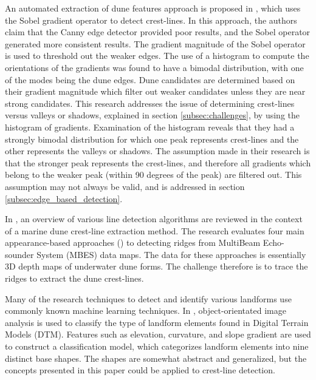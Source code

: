 An automated extraction of dune features approach is proposed in \cite{2015_automated_mapping_of_linear_dunefield}, which uses the Sobel gradient operator to detect crest-lines. In this approach, the authors claim that the Canny edge detector provided poor results, and the Sobel operator generated more consistent results. The gradient magnitude of the Sobel operator is used to threshold out the weaker edges. The use of a histogram to compute the orientations of the gradients was found to have a bimodal distribution, with one of the modes being the dune edges. Dune candidates are determined based on their gradient magnitude which filter out weaker candidates unless they are near strong candidates. This research addresses the issue of determining crest-lines versus valleys or shadows, explained in section \ref{subsec:challenges}, by using the histogram of gradients. Examination of the histogram reveals that they had a strongly bimodal distribution for which one peak represents crest-lines and the other represents the valleys or shadows. The assumption made in their research is that the stronger peak represents the crest-lines, and therefore all gradients which belong to the weaker peak (within 90 degrees of the peak) are filtered out. This assumption may not always be valid, and is addressed in section \ref{subsec:edge_based_detection}.

In \cite{2016_comparisons_crest_line_extraction_marine_dunes}, an overview of various line detection algorithms are reviewed in the context of a marine dune crest-line extraction method. The research evaluates four main appearance-based approaches (\cite{2005_topology_driven_algorithms_for_ridge_extraction,2005_smooth_feature_lines_surface_meshes,2004_ridge_valley_lines_meshes_surface_fitting}) to detecting ridges from MultiBeam Echo-sounder System (MBES) data maps. The data for these approaches is essentially 3D depth maps of underwater dune forms. The challenge therefore is to trace the ridges to extract the dune crest-lines.

Many of the research techniques to detect and identify various landforms use commonly known machine learning techniques. In \cite{2006_automated_classification_landform_elements}, object-orientated image analysis is used to classify the type of landform elements found in Digital Terrain Models (DTM). Features such as elevation, curvature, and slope gradient are used to construct a classification model, which categorizes landform elements into nine distinct base shapes. The shapes are somewhat abstract and generalized, but the concepts presented in this paper could be applied to crest-line detection.

